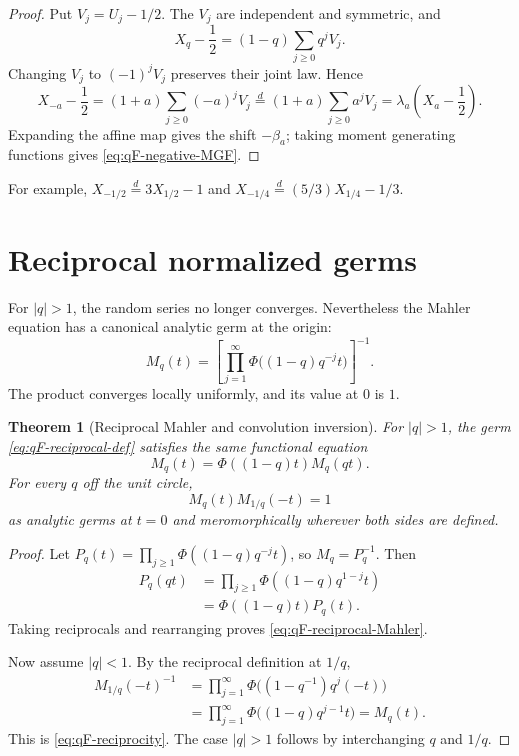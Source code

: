 \documentclass[11pt,oneside,openany]{book}
\newtheorem{theorem}{Theorem}[chapter]
\theoremstyle{definition}
\theoremstyle{remark}
\begin{document}
\begin{proof}
Put $V_j=U_j-1/2$.  The $V_j$ are independent and symmetric, and
\[
 X_q-\frac12=(1-q)\sum_{j\ge0}q^jV_j.
\]
Changing $V_j$ to $(-1)^jV_j$ preserves their joint law.  Hence
\[
 X_{-a}-\frac12
 =(1+a)\sum_{j\ge0}(-a)^jV_j
 \overset d=(1+a)\sum_{j\ge0}a^jV_j
 =\lambda_a\left(X_a-\frac12\right).
\]
Expanding the affine map gives the shift $-\beta_a$; taking moment generating
functions gives \eqref{eq:qF-negative-MGF}.
\end{proof}

For example,
$X_{-1/2}\overset d=3X_{1/2}-1$ and
$X_{-1/4}\overset d=(5/3)X_{1/4}-1/3$.

\section{Reciprocal normalized germs}

For $|q|>1$, the random series no longer converges.  Nevertheless the Mahler
equation has a canonical analytic germ at the origin:
\begin{equation}\label{eq:qF-reciprocal-def}
 M_q(t)=\left[
 \prod_{j=1}^{\infty}\Phi\bigl((1-q)q^{-j}t\bigr)
 \right]^{-1}.
\end{equation}
The product converges locally uniformly, and its value at $0$ is $1$.

\begin{theorem}[Reciprocal Mahler and convolution inversion]\label{thm:qF-reciprocity}
For $|q|>1$, the germ \eqref{eq:qF-reciprocal-def} satisfies the same
functional equation
\begin{equation}\label{eq:qF-reciprocal-Mahler}
 M_q(t)=\Phi((1-q)t)M_q(qt).
\end{equation}
For every $q$ off the unit circle,
\begin{equation}\label{eq:qF-reciprocity}
 \boxed{M_q(t)M_{1/q}(-t)=1}
\end{equation}
as analytic germs at $t=0$ and meromorphically wherever both sides are
defined.
\end{theorem}

\begin{proof}
Let
$P_q(t)=\prod_{j\ge1}\Phi((1-q)q^{-j}t)$, so $M_q=P_q^{-1}$.  Then
\begin{align*}
 P_q(qt)
 &=\prod_{j\ge1}\Phi((1-q)q^{1-j}t)\\
 &=\Phi((1-q)t)P_q(t).
\end{align*}
Taking reciprocals and rearranging proves
\eqref{eq:qF-reciprocal-Mahler}.

Now assume $|q|<1$.  By the reciprocal definition at $1/q$,
\begin{align*}
 M_{1/q}(-t)^{-1}
 &=\prod_{j=1}^{\infty}
 \Phi\bigl((1-q^{-1})q^j(-t)\bigr)\\
 &=\prod_{j=1}^{\infty}
 \Phi\bigl((1-q)q^{j-1}t\bigr)
 =M_q(t).
\end{align*}
This is \eqref{eq:qF-reciprocity}.  The case $|q|>1$ follows by interchanging
$q$ and $1/q$.
\end{proof}
\end{document}
